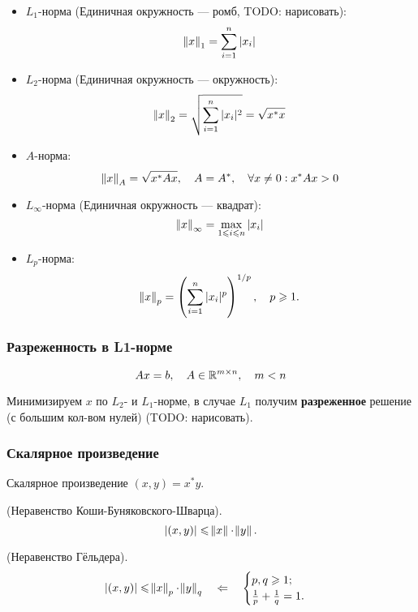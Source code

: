 \begin{itemize}
    \item $L_1$-норма (Единичная окружность --- ромб, TODO: нарисовать):
        \[
            \norm{x}_1 = \sum_{i = 1}^n |x_i|
        \]

    \item $L_2$-норма (Единичная окружность --- окружность):
        \[
            \norm{x}_2 = \sqrt{\sum_{i = 1}^n |x_i|^2} = \sqrt{x^* x}
        \]

    \item $A$-норма:
        \[
            \norm{x}_A = \sqrt{x^* A x}, \quad A = A^*,
            \quad \forall x \ne 0: x^* A x > 0
        \]

    \item $L_\infty$-норма (Единичная окружность --- квадрат):
        \[
            \norm{x}_\infty = \max_{1 \leqslant i \leqslant n} |x_i|
        \]

    \item $L_p$-норма:
        \[
            \norm{x}_p = \left( \sum_{i = 1}^n |x_i|^p \right)^{1/p},
            \quad p \geqslant 1.
        \]
\end{itemize}

\subsubsection{Разреженность в L1-норме}

\[
    A x = b, \quad A \in \mathbb{R}^{m \times n}, \quad m < n
\]

Минимизируем $x$ по $L_2$- и $L_1$-норме, в случае $L_1$ получим
\textbf{разреженное} решение (с большим кол-вом нулей) (TODO: нарисовать).

\subsubsection{Скалярное произведение}

\begin{definition}
    Скалярное произведение $(x, y) = x^* y$.
\end{definition}

\begin{theorem} (Неравенство Коши-Буняковского-Шварца).
    \[
        |(x, y)| \leqslant \norm{x} \cdot \norm{y}.
    \]
\end{theorem}

\begin{theorem} (Неравенство Гёльдера).
    \[
        |(x, y)| \leqslant \norm{x}_p \cdot \norm{y}_q \quad \Leftarrow \quad
        \begin{cases}
            p, q \geqslant 1; \\
            \frac{1}{p} + \frac{1}{q} = 1.
        \end{cases}
    \]
\end{theorem}

